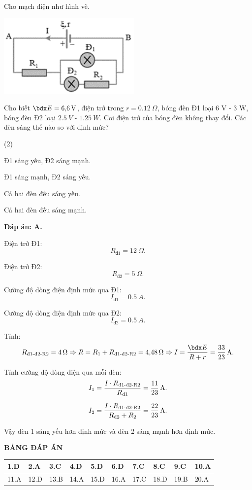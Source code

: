 \begin{enumerate}[label=\bfseries Câu \arabic*:]
	\cauhoi
	{Cho mạch điện như hình vẽ.
		\begin{center}
			\includegraphics{../figs/VN11-2021-PH-TP014-1-2}
		\end{center}
	Cho biết $\calE = \SI{6.6}{V}$, điện trở trong $r=\SI{0.12}{\Omega}$, bóng đèn Đ1 loại 6 V - 3 W, bóng đèn Đ2 loại $\SI{2.5}{V}$ - $\SI{1.25}{W}$. Coi điện trở của bóng đèn không thay đổi. Các đèn sáng thế nào so với định mức?
		
	}
	\loigiai
	{	\textbf{Đáp án: A.}
		
		Điện trở Đ1:
		$$R_\text{đ1} = \SI{12}{\Omega}.$$
		
		Điện trở Đ2:
		$$R_\text{đ2} = \SI{5}{\Omega}.$$
		
		Cường độ dòng điện định mức qua Đ1:
		$$I_\text{đ1} = \SI{0.5}{A}.$$
		
		Cường độ dòng điện định mức qua Đ2:
		$$I_\text{đ2} = \SI{0.5}{A}.$$
		
		Tính:
		$$R_\text{đ1-đ2-R2} = \SI{4}{\Omega} \Rightarrow R= R_1 + R_\text{đ1-đ2-R2} = \SI{4.48}{\Omega} \Rightarrow I = \dfrac{\calE}{R+r} = \xsi{\dfrac{33}{23}}{A}.$$
		
		Tính cường độ dòng điện qua mỗi đèn:
		$$I_1 = \dfrac{I \cdot R_\text{đ1-đ2-R2}}{R_\text{đ1}} = \xsi{\dfrac{11}{23}}{A}.$$
		
		$$I_2 = \dfrac{I \cdot R_\text{đ1-đ2-R2}}{R_\text{đ2}+R_2} = \xsi{\dfrac{22}{23}}{A}.$$
		
		Vậy đèn 1 sáng yếu hơn định mức và đèn 2 sáng mạnh hơn định mức.
	}
\end{enumerate}

\whiteBGstarEnd

\loigiai
{
	\begin{center}
		\textbf{BẢNG ĐÁP ÁN}
	\end{center}
	\begin{center}
		\begin{tabular}{|m{2.8em}|m{2.8em}|m{2.8em}|m{2.8em}|m{2.8em}|m{2.8em}|m{2.8em}|m{2.8em}|m{2.8em}|m{2.8em}|}
			\hline
			1.D  & 2.A  & 3.C  & 4.D  & 5.D  & 6.D  & 7.C  & 8.C  & 9.C  & 10.A  \\
			\hline
			11.A  & 12.D  & 13.B  & 14.A  & 15.D  & 16.A  & 17.C  & 18.D  & 19.B  & 20.A  \\
			\hline
		\end{tabular}
	\end{center}
}
